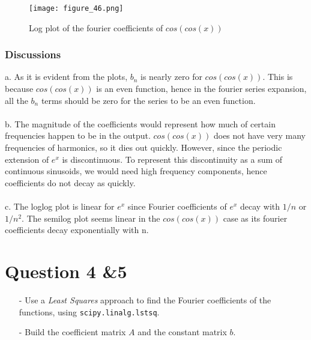 \documentclass[11pt, a4paper, twoside]{article}
\begin{document}
	\begin{figure}[!tbh]
   	\centering
   	\texttt{[image: figure\_46.png]}   
   	\caption{Log plot of the fourier coefficients of $cos(cos(x))$}
   	\label{fig:sample}
   \end{figure} 


 \subsubsection{Discussions}
a. As it is evident from the plots, $b_n$ is nearly zero for $cos(cos(x))$. This is because $cos(cos(x))$ is an even function, hence in the fourier series expansion, all the $b_n$ terms should be zero for the series to be an even function.\\\\
b. The magnitude of the coefficients would represent how much of certain frequencies happen to be in the output. $cos(cos(x))$ does not have very many frequencies of harmonics, so it dies out quickly. However, since the periodic extension of $e^{x}$ is discontinuous. To represent this discontinuity as a sum of continuous sinusoids, we would need high frequency components, hence coefficients do not decay as quickly.\\\\
c. The loglog plot is linear for $e^{x}$ since Fourier coefficients of $e^{x}$ decay with $1/n$ or $1/n^{2}$. The semilog plot seems linear in the $cos(cos(x))$ case as its fourier coefficients decay exponentially with n.


        \section{Question 4 \&5}
            \begin{itemize}
                \item[-] Use a \textit{Least Squares} approach to find the Fourier coefficients of the functions, using \texttt{scipy.linalg.lstsq}.
                \item[-] Build the coefficient matrix $A$ and the constant matrix $b$.
            \end{itemize}
\end{document}
